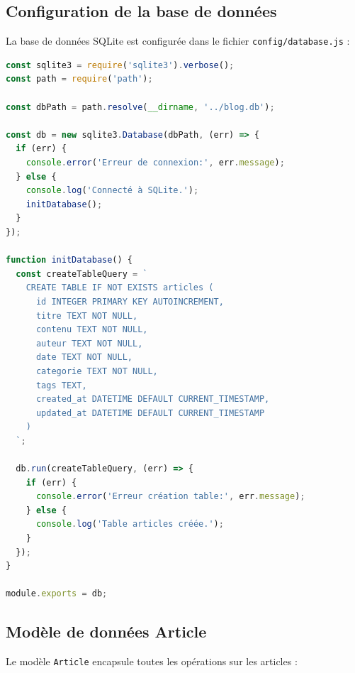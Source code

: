 \documentclass[12pt,a4paper]{article}
\begin{document}
\subsection{Configuration de la base de données}

La base de données SQLite est configurée dans le fichier \texttt{config/database.js} :

\begin{lstlisting}[language=JavaScript, caption=Configuration de la base de données (database.js)]
const sqlite3 = require('sqlite3').verbose();
const path = require('path');

const dbPath = path.resolve(__dirname, '../blog.db');

const db = new sqlite3.Database(dbPath, (err) => {
  if (err) {
    console.error('Erreur de connexion:', err.message);
  } else {
    console.log('Connecté à SQLite.');
    initDatabase();
  }
});

function initDatabase() {
  const createTableQuery = `
    CREATE TABLE IF NOT EXISTS articles (
      id INTEGER PRIMARY KEY AUTOINCREMENT,
      titre TEXT NOT NULL,
      contenu TEXT NOT NULL,
      auteur TEXT NOT NULL,
      date TEXT NOT NULL,
      categorie TEXT NOT NULL,
      tags TEXT,
      created_at DATETIME DEFAULT CURRENT_TIMESTAMP,
      updated_at DATETIME DEFAULT CURRENT_TIMESTAMP
    )
  `;

  db.run(createTableQuery, (err) => {
    if (err) {
      console.error('Erreur création table:', err.message);
    } else {
      console.log('Table articles créée.');
    }
  });
}

module.exports = db;
\end{lstlisting}

\subsection{Modèle de données Article}

Le modèle \texttt{Article} encapsule toutes les opérations sur les articles :
\end{document}
